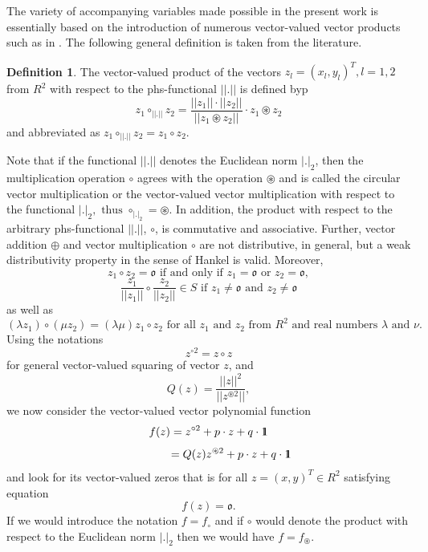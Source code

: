 \documentclass{amsart}
\theoremstyle{definition}
\newtheorem{definition}{Definition}
\theoremstyle{remark}
\numberwithin{equation}{section}
\begin{document}
 The variety of accompanying variables made possible in the present work is essentially based on the introduction of numerous vector-valued vector products such as in \cite{Richter2020,Richter2022b}. The following general definition is taken from the literature.
 \begin{definition} The vector-valued  product of the  vectors $z_l=(x_l,y_l)^T, l=1,2$ from $R^2$ with respect to the phs-functional $||.||$ is defined byp
\begin{equation}\label{Mult2} z_1 \circ_{||.||} z_2=\frac{||z_1||\cdot||z_2||}{||z_1 \circledast z_2||}\cdot z_1 \circledast z_2
\end{equation} and abbreviated as $z_1\circ_{||.||} z_2=z_1\circ z_2$.
\end{definition}
Note that if the functional $||.||$ denotes the Euclidean norm $|.|_2$, then the multiplication operation $\circ$ agrees with the operation $\circledast$ and is called the circular vector multiplication or the vector-valued  vector multiplication with respect to the functional $|.|_2, \text{ thus } \circ_{|.|_2}=\circledast$.
 In addition, the   product with respect to the arbitrary  phs-functional $||.||$, $\circ$, is commutative and associative.  Further, vector addition $\oplus$ and vector multiplication $\circ$  are not distributive, in general, but a weak distributivity property in the sense of Hankel\cite{Hankel} is valid. Moreover,
 \[z_1\circ z_2=\mathfrak o
  \text{ if and only if } z_1=\mathfrak o \text{ or } z_2=\mathfrak o,
  \] \[\frac{z_1}{||z_1||}\circ\frac{z_2}{||z_2||}\in S \text{ if } z_1\neq \mathfrak o \text{ and } z_2\neq\mathfrak o
   \]
   as well as
   \[(\lambda z_1)\circ(\mu z_2)=(\lambda\mu)z_1\circ z_2 \text{ for all } z_1 \text{ and } z_2 \text{ from }R^2
   \text{ and  real numbers }\lambda \text{ and }\nu
   .\]Using the notations
   \[
z^{\circ 2}   =z\circ z
   \]for general vector-valued squaring of vector $z$, and \[Q(z)= \frac{||z||^2}{||z^{\circledast 2}||},\]
we now consider the vector-valued vector polynomial function
\[
f(z)=z^{\circ 2}+p\cdot z +q\cdot 1\hspace{-.14cm}1\]
\[
\qquad\qquad=Q(z)z^{\circledast 2}+p\cdot z +q\cdot 1\hspace{-.14cm}1
\]
and look for its vector-valued zeros that is for all $z=(x,y)^T\in R^2$ satisfying equation
\begin{equation} \label{Null3}
f(z)=\mathfrak o.
\end{equation}
If we would  introduce the notation $f=f_{\circ}$ and if $\circ$ would denote the product with respect to the Euclidean norm $|.|_2$
then we would have $f=f_\circledast$.
\end{document}
